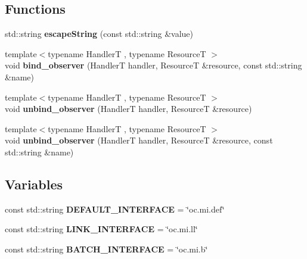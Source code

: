 \subsection*{Functions}
\begin{DoxyCompactItemize}
\item 
\hypertarget{namespaceOC_a520c465221b4903ab5efe76dbad2a26b}{}std\+::string {\bfseries escape\+String} (const std\+::string \&value)\label{namespaceOC_a520c465221b4903ab5efe76dbad2a26b}

\item 
\hypertarget{namespaceOC_a5f45556fe6d98f84e46c3f933c2e2059}{}{\footnotesize template$<$typename Handler\+T , typename Resource\+T $>$ }\\void {\bfseries bind\+\_\+observer} (Handler\+T handler, Resource\+T \&resource, const std\+::string \&name)\label{namespaceOC_a5f45556fe6d98f84e46c3f933c2e2059}

\item 
\hypertarget{namespaceOC_a5d4e246da1f4126e75b280f7026d6f0c}{}{\footnotesize template$<$typename Handler\+T , typename Resource\+T $>$ }\\void {\bfseries unbind\+\_\+observer} (Handler\+T handler, Resource\+T \&resource)\label{namespaceOC_a5d4e246da1f4126e75b280f7026d6f0c}

\item 
\hypertarget{namespaceOC_a62a6829f5baa57ee6110ba8c8992db9d}{}{\footnotesize template$<$typename Handler\+T , typename Resource\+T $>$ }\\void {\bfseries unbind\+\_\+observer} (Handler\+T handler, Resource\+T \&resource, const std\+::string \&name)\label{namespaceOC_a62a6829f5baa57ee6110ba8c8992db9d}

\end{DoxyCompactItemize}
\subsection*{Variables}
\begin{DoxyCompactItemize}
\item 
\hypertarget{namespaceOC_a7e6e1b012a50ae24d9e905156f50f176}{}const std\+::string {\bfseries D\+E\+F\+A\+U\+L\+T\+\_\+\+I\+N\+T\+E\+R\+F\+A\+C\+E} = \char`\"{}oc.\+mi.\+def\char`\"{}\label{namespaceOC_a7e6e1b012a50ae24d9e905156f50f176}

\item 
\hypertarget{namespaceOC_af20aa7bfec3ecf78f44f95e22d4ee315}{}const std\+::string {\bfseries L\+I\+N\+K\+\_\+\+I\+N\+T\+E\+R\+F\+A\+C\+E} = \char`\"{}oc.\+mi.\+ll\char`\"{}\label{namespaceOC_af20aa7bfec3ecf78f44f95e22d4ee315}

\item 
\hypertarget{namespaceOC_a40c5c32028c75f13d93e71da0b9fa3d2}{}const std\+::string {\bfseries B\+A\+T\+C\+H\+\_\+\+I\+N\+T\+E\+R\+F\+A\+C\+E} = \char`\"{}oc.\+mi.\+b\char`\"{}\label{namespaceOC_a40c5c32028c75f13d93e71da0b9fa3d2}

\end{DoxyCompactItemize}


